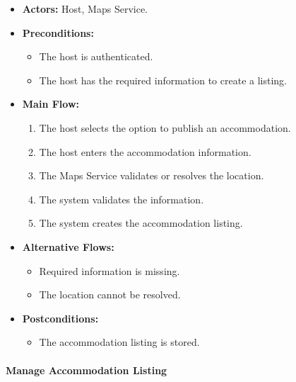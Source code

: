 \begin{itemize}
    \item \textbf{Actors:} Host, Maps Service.
    
    \item \textbf{Preconditions:}
    \begin{itemize}
        \item The host is authenticated.
        \item The host has the required information to create a listing.
    \end{itemize}
    
    \item \textbf{Main Flow:}
    \begin{enumerate}
        \item The host selects the option to publish an accommodation.
        \item The host enters the accommodation information.
        \item The Maps Service validates or resolves the location.
        \item The system validates the information.
        \item The system creates the accommodation listing.
    \end{enumerate}
    
    \item \textbf{Alternative Flows:}
    \begin{itemize}
        \item Required information is missing.
        \item The location cannot be resolved.
    \end{itemize}
    
    \item \textbf{Postconditions:}
    \begin{itemize}
        \item The accommodation listing is stored.
    \end{itemize}
\end{itemize}


\paragraph{Manage Accommodation Listing}

